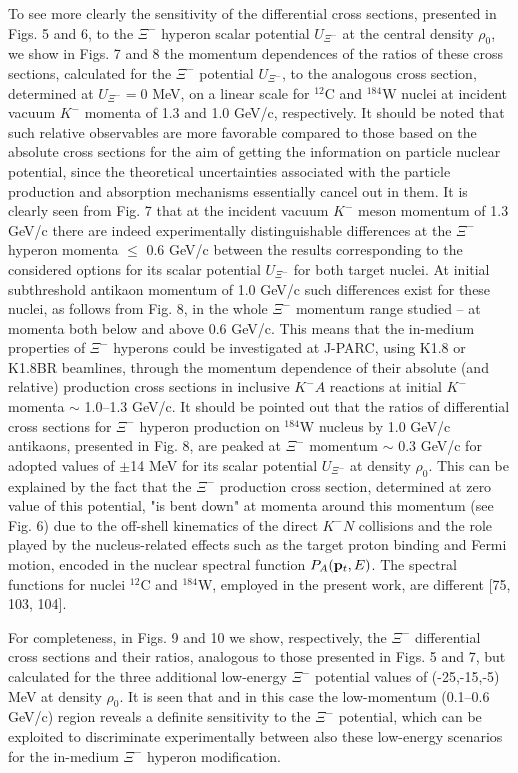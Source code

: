 \documentclass[12pt]{article}
\begin{document}
To see more clearly the sensitivity of the differential cross sections, presented in Figs. 5 and 6,
to the $\Xi^-$ hyperon scalar potential $U_{\Xi^-}$ at the central density $\rho_0$, we show in Figs. 7 and 8
the momentum dependences of the ratios of these cross sections, calculated for
the $\Xi^-$ potential $U_{\Xi^-}$, to the analogous cross section, determined at $U_{\Xi^-}=0$ MeV, on a linear scale for $^{12}$C and $^{184}$W nuclei at incident vacuum $K^-$ momenta of 1.3 and 1.0 GeV/c, respectively.
It should be noted that such relative observables are more favorable compared to those based on the
absolute cross sections for the aim of getting the information on particle nuclear potential, since
the theoretical uncertainties associated with the particle production and absorption mechanisms essentially
cancel out in them. It is clearly seen from Fig. 7 that at the incident vacuum $K^-$ meson momentum of 1.3 GeV/c
there are indeed experimentally distinguishable differences at the $\Xi^-$ hyperon momenta $\le$ 0.6 GeV/c
between the results corresponding to the considered options for its scalar potential $U_{\Xi^-}$ for both
target nuclei. At initial subthreshold antikaon momentum of 1.0 GeV/c such differences exist
for these nuclei, as follows from Fig. 8,
in the whole $\Xi^-$ momentum range studied -- at momenta both below and above 0.6 GeV/c.
This means that the in-medium properties of $\Xi^-$ hyperons could be investigated at J-PARC,
using K1.8 or K1.8BR beamlines, through the momentum dependence of their absolute (and relative) production cross sections in inclusive $K^-A$ reactions at initial $K^-$ momenta $\sim$ 1.0--1.3 GeV/c.
It should be pointed out that the ratios of differential cross sections for $\Xi^-$ hyperon production
on $^{184}$W nucleus by 1.0 GeV/c antikaons, presented in Fig. 8, are peaked at $\Xi^-$
momentum $\sim$ 0.3 GeV/c for adopted values of $\pm$14 MeV for its scalar potential $U_{\Xi^-}$ at density $\rho_0$.
This can be explained by the fact that the $\Xi^-$ production cross section, determined at zero value of this
potential, "is bent down" at momenta around this momentum (see Fig. 6) due to the off-shell kinematics
of the direct $K^-N$ collisions and the role played by the nucleus-related effects such as the target proton
binding and Fermi motion, encoded in the nuclear spectral function $P_A({\bf p}_t,E)$. The spectral functions
for nuclei $^{12}$C and $^{184}$W, employed in the present work, are different [75, 103, 104].

   For completeness, in Figs. 9 and 10 we show, respectively, the $\Xi^-$ differential cross sections and
their ratios, analogous to those presented in Figs. 5 and 7, but calculated for the three additional low-energy
$\Xi^-$ potential values of (-25,-15,-5) MeV at density $\rho_0$. It is seen that and in this case the
low-momentum (0.1--0.6 GeV/c) region reveals a definite sensitivity to the $\Xi^-$ potential, which can be
exploited to discriminate experimentally between also these low-energy scenarios for the in-medium
$\Xi^-$ hyperon modification.
\end{document}

